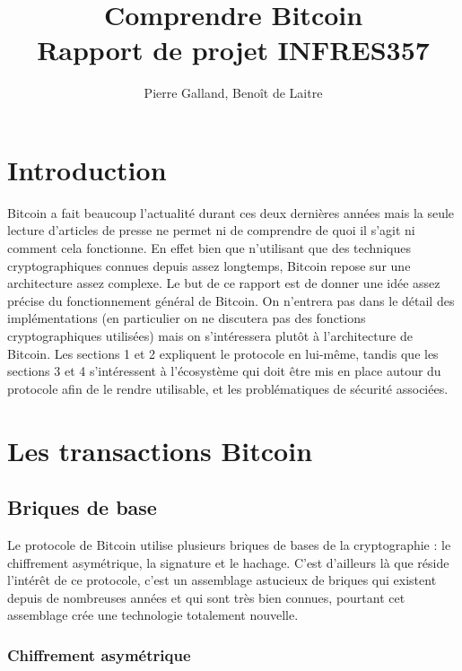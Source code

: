 \documentclass[11pt,a4paper]{article}
\title{Comprendre Bitcoin\\
Rapport de projet INFRES357
}
\author{Pierre Galland, Benoît de Laitre}
\begin{document}
\maketitle

\tableofcontents
 \nocite{*}
 
\newpage

\section*{Introduction}

Bitcoin a fait beaucoup l'actualité durant ces deux dernières années mais la seule lecture d'articles de presse ne permet ni de comprendre de quoi il s'agit ni comment cela fonctionne. En effet bien que n'utilisant que des techniques cryptographiques connues depuis assez longtemps, Bitcoin repose sur une architecture assez complexe. Le but de ce rapport est de donner une idée assez précise du fonctionnement général de Bitcoin. On n'entrera pas dans le détail des implémentations (en particulier on ne discutera pas des fonctions cryptographiques utilisées) mais on s'intéressera plutôt à l'architecture de Bitcoin. Les sections 1 et 2 expliquent le protocole en lui-même, tandis que les sections 3 et 4 s'intéressent à l'écosystème qui doit être mis en place autour du protocole afin de le rendre utilisable, et les problématiques de sécurité associées.

\section{Les transactions Bitcoin}

\subsection{Briques de base}

Le protocole de Bitcoin utilise plusieurs briques de bases de la cryptographie : le chiffrement asymétrique, la signature et le hachage. C'est d'ailleurs là que réside l'intérêt de ce protocole, c'est un assemblage astucieux de briques qui existent depuis de nombreuses années et qui sont très bien connues, pourtant cet assemblage crée une technologie totalement nouvelle.

\subsubsection{Chiffrement asymétrique}
\end{document}
